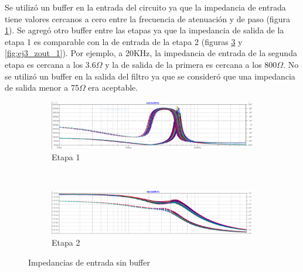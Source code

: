 \documentclass[../../tc_tp5_main.tex]{subfiles}
\begin{document}
Se utiliz\'o un buffer en la entrada del circuito ya que la impedancia de entrada tiene valores cercanos a cero entre la frecuencia de atenuaci\'on y de paso (figura \ref{fig:ej3_zin_1}). Se agreg\'o otro buffer entre las etapas ya que la impedancia de salida de la etapa 1 es comparable con la de entrada de la etapa 2 (figuras \ref{fig:ej3_zin_2} y \ref{fig:ej3_zout_1}). Por ejemplo, a 20KHz, la impedancia de entrada de la segunda etapa es cercana a los 3.6$\Omega$ y la de salida de la primera es cercana a los 800$\Omega$. No se utiliz\'o un buffer en la salida del filtro ya que se consider\'o que una impedancia de salida menor a 75$\Omega$ era aceptable.





\begin{figure}[H]	%
	\centering
	\begin{subfigure}[t]{\textwidth}
		\centering
		\includegraphics[width=\textwidth]{imagenes/zin_1.png}
		\caption{Etapa 1}
		\label{fig:ej3_zin_1}
	\end{subfigure}\\
	\begin{subfigure}[t]{\textwidth}
		\centering
		\includegraphics[width=\textwidth]{imagenes/zin_2.png}
		\caption{Etapa 2}
		\label{fig:ej3_zin_2}
	\end{subfigure}	
	\caption{Impedancias de entrada sin buffer}
\end{figure}
\end{document}
